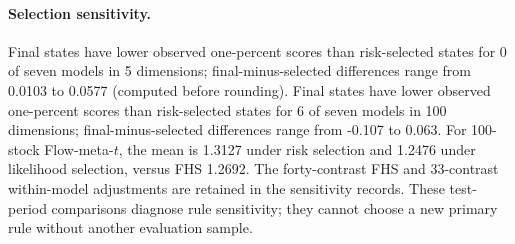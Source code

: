 \documentclass[11pt]{article}
\theoremstyle{definition}\newtheorem{definition}[theorem]{Definition}
\theoremstyle{remark}\newtheorem{remark}[theorem]{Remark}
\begin{document}
\paragraph{Selection sensitivity.}
Final states have lower observed one-percent scores than risk-selected states for 0 of seven models in 5 dimensions; final-minus-selected differences range from 0.0103 to 0.0577 (computed before rounding). Final states have lower observed one-percent scores than risk-selected states for 6 of seven models in 100 dimensions; final-minus-selected differences range from -0.107 to 0.063. For 100-stock Flow-meta-$t$, the mean is 1.3127 under risk selection and 1.2476 under likelihood selection, versus FHS 1.2692. The forty-contrast FHS and 33-contrast within-model adjustments are retained in the sensitivity records. These test-period comparisons diagnose rule sensitivity; they cannot choose a new primary rule without another evaluation sample.
\end{document}
